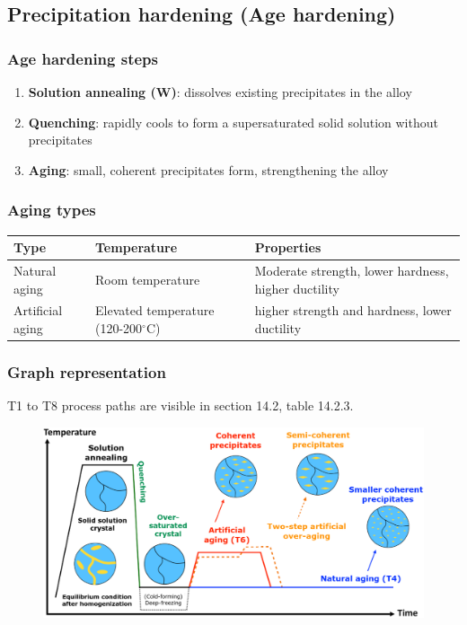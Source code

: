 \documentclass{article}
\begin{document}
\newpage
\subsection{Precipitation hardening (Age hardening)}
\subsubsection{Age hardening steps}
\begin{enumerate}
  \item \textbf{Solution annealing (W)}: dissolves existing precipitates in the alloy
  \item \textbf{Quenching}: rapidly cools to form a supersaturated solid solution without precipitates
  \item \textbf{Aging}: small, coherent precipitates form, strengthening the alloy
\end{enumerate}

\subsubsection{Aging types}
\begin{table}[ht!]
  \centering
  \begin{tabular}{|l|l|l|}
    \hline \textbf{Type} & \textbf{Temperature} & \textbf{Properties}\\
    \hline Natural aging & Room temperature & Moderate strength, lower hardness, higher ductility\\
    \hline Artificial aging & Elevated temperature (120-200$^\circ$C) & higher strength and hardness, lower ductility\\
    \hline 
  \end{tabular}
\end{table}

\subsubsection{Graph representation}
T1 to T8 process paths are visible in section 14.2, table 14.2.3.

\begin{figure}[ht!]
  \centering
  \includegraphics[width=.9\textwidth]{media/aging.png}
\end{figure}
\end{document}
